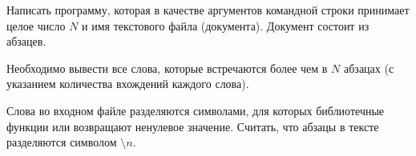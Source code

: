 
Написать программу, которая в качестве аргументов командной строки
принимает целое число $N$ и имя текстового файла (документа). Документ
состоит из абзацев.

Необходимо вывести все слова, которые встречаются
более чем в $N$ абзацах (с указанием количества вхождений каждого слова).

Слова во входном файле разделяются символами, для которых
библиотечные функции  или  возвращают ненулевое
значение. Считать, что абзацы в тексте разделяются символом $\setminus n$.
